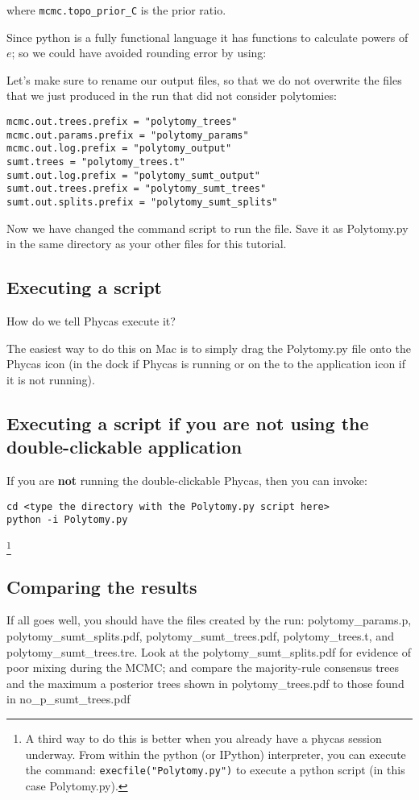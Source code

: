 \documentclass{article}
\newcommand{\cmd}[1]{\texttt{#1}\xspace}
\newcommand{\phycas}{Phycas\xspace}
\newcommand{\localfile}[1]{\textsf{#1}\xspace}
\begin{document}
where \cmd{mcmc.topo\_prior\_C} is the prior ratio.

Since python is a fully functional language it has functions to
calculate powers of $e$; so we could have avoided rounding 
error by using:

Let's make sure to rename our output files, so that we do not overwrite the files that we just produced
in the run that did not consider polytomies:
\begin{verbatim}
mcmc.out.trees.prefix = "polytomy_trees"
mcmc.out.params.prefix = "polytomy_params"
mcmc.out.log.prefix = "polytomy_output"
sumt.trees = "polytomy_trees.t"
sumt.out.log.prefix = "polytomy_sumt_output"
sumt.out.trees.prefix = "polytomy_sumt_trees"
sumt.out.splits.prefix = "polytomy_sumt_splits"
\end{verbatim}

Now we have changed the command script to run the file. Save it as \localfile{Polytomy.py} in the same directory as your other files for this tutorial.

\subsection{Executing a script}
How do we tell \phycas execute it?

The easiest way to do this on Mac is to simply drag the \localfile{Polytomy.py} file onto the \phycas icon (in the dock if \phycas is running or on the to the application icon if it is not running).

\subsection{Executing a script if you are not using the double-clickable application}
If you are {\bf not} running the double-clickable \phycas, then you can invoke:
\begin{verbatim}
cd <type the directory with the Polytomy.py script here>
python -i Polytomy.py
\end{verbatim}

\footnote{
A third way to do this is better when you already have a phycas session underway. 
From within the python (or IPython) interpreter, you can execute the command:
\cmd{execfile("Polytomy.py")}
to execute a python script (in this case  \localfile{Polytomy.py}).
}

\subsection{Comparing the results}
If all goes well, you should have the files created by the run:
\localfile{polytomy\_params.p}, \localfile{polytomy\_sumt\_splits.pdf}, \localfile{polytomy\_sumt\_trees.pdf}, \localfile{polytomy\_trees.t}, and \localfile{polytomy\_sumt\_trees.tre}.
Look at the \localfile{polytomy\_sumt\_splits.pdf}  for evidence of poor mixing  during the MCMC; 
and compare the majority-rule consensus trees and the maximum a posterior trees shown in  \localfile{polytomy\_trees.pdf} to those found in \localfile{no\_p\_sumt\_trees.pdf}
\end{document}
